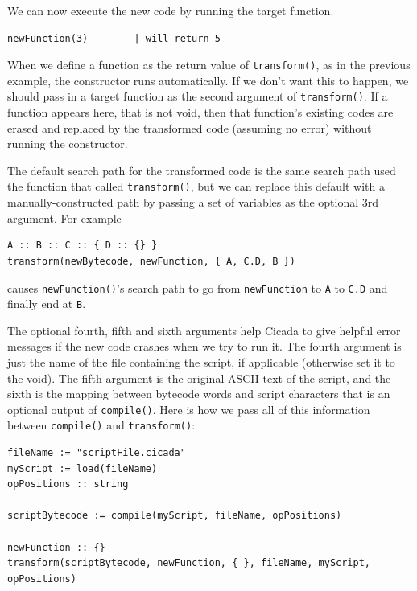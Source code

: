 \documentclass{article}
\newenvironment{code}{
       \begin{list}{}{
               \setlength{\leftmargin}{.4in}
               \setlength{\rightmargin}{0in}
               \setlength{\topsep}{.2in}
       }
       \small
       \item[] }
       { \end{list}   }
\begin{document}
\noindent We can now execute the new code by running the target function.

\begin{code} \begin{verbatim}
newFunction(3)        | will return 5
\end{verbatim} \end{code}

When we define a function as the return value of \verb#transform()#, as in the previous example, the constructor runs automatically.  If we don't want this to happen, we should pass in a target function as the second argument of \verb#transform()#.  If a function appears here, that is not void, then that function's existing codes are erased and replaced by the transformed code (assuming no error) without running the constructor.

The default search path for the transformed code is the same search path used the function that called \verb#transform()#, but we can replace this default with a manually-constructed path by passing a set of variables as the optional 3rd argument.  For example

\begin{code} \begin{verbatim}
A :: B :: C :: { D :: {} }
transform(newBytecode, newFunction, { A, C.D, B })
\end{verbatim} \end{code}

\noindent causes \verb#newFunction()#'s search path to go from \verb#newFunction# to \verb#A# to \verb#C.D# and finally end at \verb#B#.

The optional fourth, fifth and sixth arguments help Cicada to give helpful error messages if the new code crashes when we try to run it.  The fourth argument is just the name of the file containing the script, if applicable (otherwise set it to the void).  The fifth argument is the original ASCII text of the script, and the sixth is the mapping between bytecode words and script characters that is an optional output of \verb#compile()#.  Here is how we pass all of this information between \verb#compile()# and \verb#transform()#:

\begin{code} \begin{verbatim}
fileName := "scriptFile.cicada"
myScript := load(fileName)
opPositions :: string

scriptBytecode := compile(myScript, fileName, opPositions)

newFunction :: {}
transform(scriptBytecode, newFunction, { }, fileName, myScript, opPositions)
\end{verbatim} \end{code}
\end{document}
